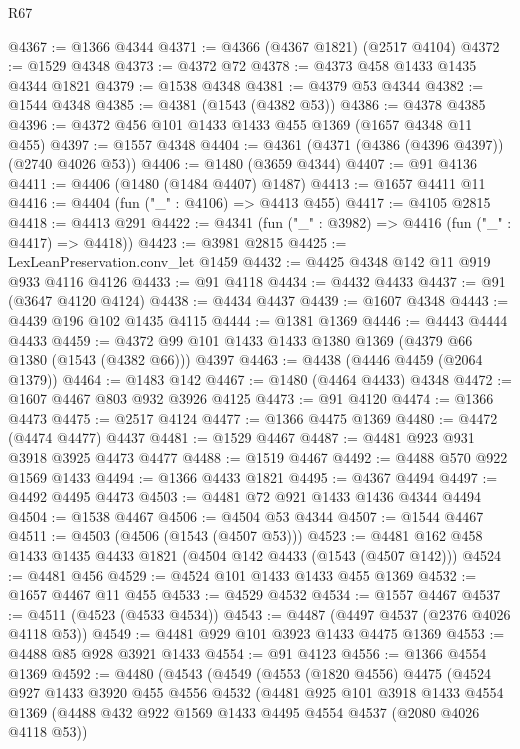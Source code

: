 \begin{lexlean}{R67}
\begin{coremodule}
@4367 := @1366 @4344
@4371 := @4366 (@4367 @1821) (@2517 @4104)
@4372 := @1529 @4348
@4373 := @4372 @72
@4378 := @4373 @458 @1433 @1435 @4344 @1821
@4379 := @1538 @4348
@4381 := @4379 @53 @4344
@4382 := @1544 @4348
@4385 := @4381 (@1543 (@4382 @53))
@4386 := @4378 @4385
@4396 := @4372 @456 @101 @1433 @1433 @455 @1369 (@1657 @4348 @11 @455)
@4397 := @1557 @4348
@4404 := @4361 (@4371 (@4386 (@4396 @4397)) (@2740 @4026 @53))
@4406 := @1480 (@3659 @4344)
@4407 := @91 @4136
@4411 := @4406 (@1480 (@1484 @4407) @1487)
@4413 := @1657 @4411 @11
@4416 := @4404 (fun ("_" : @4106) => @4413 @455)
@4417 := @4105 @2815
@4418 := @4413 @291
@4422 := @4341 (fun ("_" : @3982) => @4416 (fun ("_" : @4417) => @4418))
@4423 := @3981 @2815
@4425 := LexLeanPreservation.conv_let @1459
@4432 := @4425 @4348 @142 @11 @919 @933 @4116 @4126
@4433 := @91 @4118
@4434 := @4432 @4433
@4437 := @91 (@3647 @4120 @4124)
@4438 := @4434 @4437
@4439 := @1607 @4348
@4443 := @4439 @196 @102 @1435 @4115
@4444 := @1381 @1369
@4446 := @4443 @4444 @4433
@4459 := @4372 @99 @101 @1433 @1433 @1380 @1369 (@4379 @66 @1380 (@1543 (@4382 @66))) @4397
@4463 := @4438 (@4446 @4459 (@2064 @1379))
@4464 := @1483 @142
@4467 := @1480 (@4464 @4433) @4348
@4472 := @1607 @4467 @803 @932 @3926 @4125
@4473 := @91 @4120
@4474 := @1366 @4473
@4475 := @2517 @4124
@4477 := @1366 @4475 @1369
@4480 := @4472 (@4474 @4477) @4437
@4481 := @1529 @4467
@4487 := @4481 @923 @931 @3918 @3925 @4473 @4477
@4488 := @1519 @4467
@4492 := @4488 @570 @922 @1569 @1433
@4494 := @1366 @4433 @1821
@4495 := @4367 @4494
@4497 := @4492 @4495 @4473
@4503 := @4481 @72 @921 @1433 @1436 @4344 @4494
@4504 := @1538 @4467
@4506 := @4504 @53 @4344
@4507 := @1544 @4467
@4511 := @4503 (@4506 (@1543 (@4507 @53)))
@4523 := @4481 @162 @458 @1433 @1435 @4433 @1821 (@4504 @142 @4433 (@1543 (@4507 @142)))
@4524 := @4481 @456
@4529 := @4524 @101 @1433 @1433 @455 @1369
@4532 := @1657 @4467 @11 @455
@4533 := @4529 @4532
@4534 := @1557 @4467
@4537 := @4511 (@4523 (@4533 @4534))
@4543 := @4487 (@4497 @4537 (@2376 @4026 @4118 @53))
@4549 := @4481 @929 @101 @3923 @1433 @4475 @1369
@4553 := @4488 @85 @928 @3921 @1433
@4554 := @91 @4123
@4556 := @1366 @4554 @1369
@4592 := @4480
    (@4543
      (@4549
        (@4553
          (@1820 @4556)
          @4475
          (@4524
            @927
            @1433
            @3920
            @455
            @4556
            @4532
            (@4481
              @925
              @101
              @3918
              @1433
              @4554
              @1369
              (@4488 @432 @922 @1569 @1433 @4495 @4554 @4537 (@2080 @4026 @4118 @53))

\end{coremodule}
\end{lexlean}
